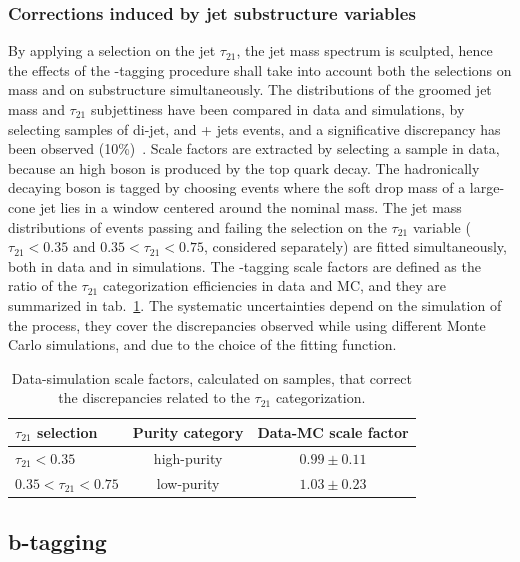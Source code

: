\subsubsection{Corrections induced by jet substructure variables}
\label{ssec:jetsub_corr}
By applying a selection on the jet $\tau_{21}$, the jet mass spectrum is sculpted, hence the effects of the \V-tagging procedure shall take into account both the selections on mass and on substructure simultaneously. The distributions of the groomed jet mass and $\tau_{21}$ subjettiness have been compared in data and simulations, by selecting samples of di-jet, \ttbar and \W + jets events, and a significative discrepancy has been observed (10\%)~\cite{Khachatryan:2014vla}. Scale factors are extracted by selecting a \ttbar sample in data, because an high \pt \W boson is produced by the top quark decay. The hadronically decaying \W boson is tagged by choosing events where the soft drop mass of a large-cone jet lies in a window centered around the nominal \W mass. The jet mass distributions of events passing and failing the selection on the $\tau_{21}$ variable ($\tau_{21}<0.35$ and $0.35 < \tau_{21} < 0.75$, considered separately) are fitted simultaneously, both in data and in simulations. The \V-tagging scale factors are defined as the ratio of the $\tau_{21}$ categorization efficiencies in data and MC, and they are summarized in tab.~\ref{tab:tau21_sf}. The systematic uncertainties depend on the simulation of the \ttbar process, they cover the discrepancies observed while using different Monte Carlo simulations, and due to the choice of the fitting function.

\begin{table}[!htb]
  \centering
  \caption{Data-simulation scale factors, calculated on \ttbar samples, that correct the discrepancies related to the $\tau_{21}$ categorization.}
  \begin{tabular}{l|cc}
    $\tau_{21}$ selection & Purity category & Data-MC scale factor \\
    \hline
    \hline
    $\tau_{21}<0.35$ & high-purity & $0.99 \pm 0.11$ \\
    $0.35 < \tau_{21} < 0.75$ & low-purity & $1.03 \pm 0.23$ \\
  \end{tabular}

  \label{tab:tau21_sf}
\end{table}

\subsection{b-tagging}\label{ssec:btagging}
 
